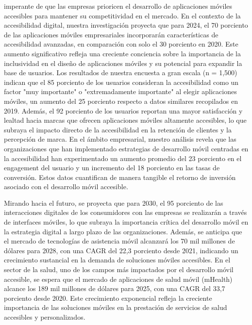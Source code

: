 \documentclass[12pt]{article}
\begin{document}
imperante de que las empresas prioricen el desarrollo de aplicaciones móviles accesibles para mantener su competitividad en el mercado.
En el contexto de la accesibilidad digital, nuestra investigación proyecta que para 2024, el 70 porciento de las aplicaciones móviles empresariales incorporarán características de accesibilidad avanzadas, en comparación con solo el 30 porciento en 2020. Este aumento significativo refleja una creciente conciencia sobre la importancia de la inclusividad en el diseño de aplicaciones móviles y su potencial para expandir la base de usuarios.
Los resultados de nuestra encuesta a gran escala (n = 1,500) indican que el 85 porciento de los usuarios consideran la accesibilidad como un factor "muy importante" o "extremadamente importante" al elegir aplicaciones móviles, un aumento del 25 porciento respecto a datos similares recopilados en 2019. Además, el 92 porciento de los usuarios reportan una mayor satisfacción y lealtad hacia marcas que ofrecen aplicaciones móviles altamente accesibles, lo que subraya el impacto directo de la accesibilidad en la retención de clientes y la percepción de marca.
En el ámbito empresarial, nuestro análisis revela que las organizaciones que han implementado estrategias de desarrollo móvil centradas en la accesibilidad han experimentado un aumento promedio del 23 porciento en el engagement del usuario y un incremento del 18 porciento en las tasas de conversión. Estos datos cuantifican de manera tangible el retorno de inversión asociado con el desarrollo móvil accesible.

Mirando hacia el futuro, se proyecta que para 2030, el 95 porciento de las interacciones digitales de los consumidores con las empresas se realizarán a través de interfaces móviles, lo que subraya la importancia crítica del desarrollo móvil en la estrategia digital a largo plazo de las organizaciones. Además, se anticipa que el mercado de tecnologías de asistencia móvil alcanzará los 70 mil millones de dólares para 2028, con una CAGR del 22,3 porciento desde 2021, indicando un crecimiento sustancial en la demanda de soluciones móviles accesibles.
En el sector de la salud, uno de los campos más impactados por el desarrollo móvil accesible, se espera que el mercado de aplicaciones de salud móvil (mHealth) alcance los 189 mil millones de dólares para 2025, con una CAGR del 33,7 porciento desde 2020. Este crecimiento exponencial refleja la creciente importancia de las soluciones móviles en la prestación de servicios de salud accesibles y personalizados.
 
\end{document}

